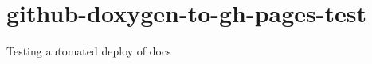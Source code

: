 \chapter{github-\/doxygen-\/to-\/gh-\/pages-\/test}
\hypertarget{md_README}{}\label{md_README}
\label{md_README_autotoc_md0}%
%


Testing automated deploy of docs 